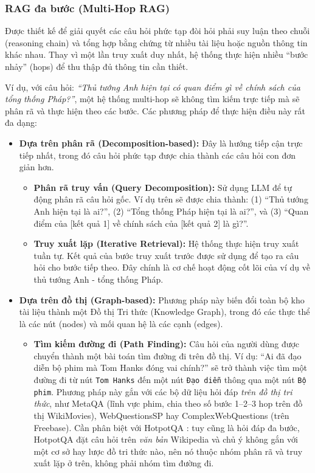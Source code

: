 \subsubsection{RAG đa bước (Multi-Hop RAG)}
\label{sssec:multi_hop_rag}
Được thiết kế để giải quyết các câu hỏi phức tạp đòi hỏi phải suy luận theo chuỗi (reasoning chain) và tổng hợp bằng chứng từ nhiều tài liệu hoặc nguồn thông tin khác nhau. Thay vì một lần truy xuất duy nhất, hệ thống thực hiện nhiều “bước nhảy” (hops) để thu thập đủ thông tin cần thiết.

Ví dụ, với câu hỏi: \textit{“Thủ tướng Anh hiện tại có quan điểm gì về chính sách của tổng thống Pháp?”}, một hệ thống multi-hop sẽ không tìm kiếm trực tiếp mà sẽ phân rã và thực hiện theo các bước. Các phương pháp để thực hiện điều này rất đa dạng:

\begin{itemize}
	\item \textbf{Dựa trên phân rã (Decomposition-based):}
	Đây là hướng tiếp cận trực tiếp nhất, trong đó câu hỏi phức tạp được chia thành các câu hỏi con đơn giản hơn.
	\begin{itemize}
		\item \textbf{Phân rã truy vấn (Query Decomposition):}
		Sử dụng LLM để tự động phân rã câu hỏi gốc. Ví dụ trên sẽ được chia thành: (1) “Thủ tướng Anh hiện tại là ai?”, (2) “Tổng thống Pháp hiện tại là ai?”, và (3) “Quan điểm của [kết quả 1] về chính sách của [kết quả 2] là gì?”.
		\item \textbf{Truy xuất lặp (Iterative Retrieval):}
		Hệ thống thực hiện truy xuất tuần tự. Kết quả của bước truy xuất trước được sử dụng để tạo ra câu hỏi cho bước tiếp theo. Đây chính là cơ chế hoạt động cốt lõi của ví dụ về thủ tướng Anh - tổng thống Pháp.
	\end{itemize}
	
	\item \textbf{Dựa trên đồ thị (Graph-based):}
	Phương pháp này biến đổi toàn bộ kho tài liệu thành một Đồ thị Tri thức (Knowledge Graph), trong đó các thực thể là các nút (nodes) và mối quan hệ là các cạnh (edges).
	\begin{itemize}
		\item \textbf{Tìm kiếm đường đi (Path Finding):}
		Câu hỏi của người dùng được chuyển thành một bài toán tìm đường đi trên đồ thị. Ví dụ: “Ai đã đạo diễn bộ phim mà Tom Hanks đóng vai chính?” sẽ trở thành việc tìm một đường đi từ nút \texttt{Tom Hanks} đến một nút \texttt{Đạo diễn} thông qua một nút \texttt{Bộ phim}. Phương pháp này gắn với các bộ dữ liệu hỏi đáp \textit{trên đồ thị tri thức}, như MetaQA \cite{zhang2017metaqa} (lĩnh vực phim, chia theo số bước 1--2--3 hop trên đồ thị WikiMovies), WebQuestionsSP \cite{yih2016webqsp} hay ComplexWebQuestions \cite{talmor2018complexwebq} (trên Freebase). Cần phân biệt với HotpotQA \cite{yang2018hotpotqa}: tuy cũng là hỏi đáp đa bước, HotpotQA đặt câu hỏi trên \textit{văn bản} Wikipedia và chủ ý không gắn với một cơ sở hay lược đồ tri thức nào, nên nó thuộc nhóm phân rã và truy xuất lặp ở trên, không phải nhóm tìm đường đi.
	\end{itemize}
	

\end{itemize}
